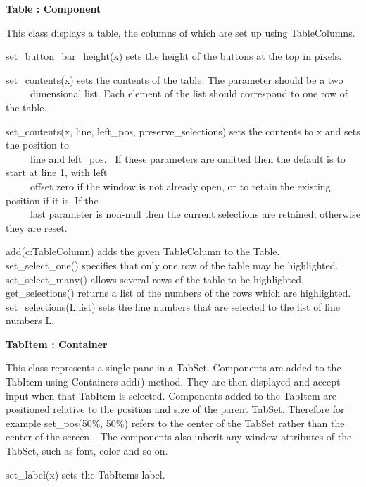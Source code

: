 {\sffamily\bfseries
{}Table : Component}

This class displays a table, the columns of which are set up using
TableColumns.

set\_button\_bar\_height(x) sets the height of the buttons at the top in
pixels.

set\_contents(x) sets the contents of the table. The parameter should be
a two\\
 \ \ \ \ \ dimensional list. Each element of the list should correspond
to one row of the table.

set\_contents(x, line, left\_pos, preserve\_selections) sets the
contents to x and sets the position to\\
 \ \ \ \ \ line and left\_pos. \ If these parameters are omitted then
the default is to start at line 1, with left\\
 \ \ \ \ \ offset zero if the window is not already open, or to retain
the existing position if it is. If the\\
 \ \ \ \ \ last parameter is non-null then the current selections are
retained; otherwise they are reset.

add(c:TableColumn) adds the given TableColumn to the Table.\\
set\_select\_one() specifies that only one row of the table may be
highlighted.\\
set\_select\_many() allows several rows of the table to be
highlighted.\\
get\_selections() returns a list of the numbers of the rows which are
highlighted.\\
set\_selections(L:list) sets the line numbers that are selected to the
list of line numbers L.

{\sffamily\bfseries
{}TabItem : Container}

This class represents a single pane in a TabSet. Components are added to
the TabItem using Container{\textquotesingle}s add() method. They are
then displayed and accept input when that TabItem is selected.
Components added to the TabItem are positioned relative to the position
and size of the parent TabSet. Therefore for example
set\_pos({\textquotedbl}50\%{\textquotedbl},
{\textquotedbl}50\%{\textquotedbl}) refers to the center of the TabSet
rather than the center of the screen. \ The components also inherit any
window attributes of the TabSet, such as font, color and so on.

set\_label(x) sets the TabItem{\textquotesingle}s label.

